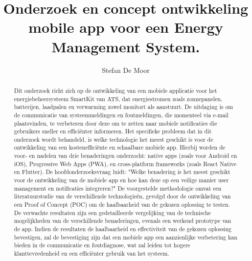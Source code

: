 \documentclass{hogent-article}
\title{Onderzoek en concept ontwikkeling mobile app voor een Energy Management System.}
\author{Stefan De Moor}
\begin{document}
\begin{abstract}
  Dit onderzoek richt zich op de ontwikkeling van een mobiele applicatie voor het energiebeheersysteem SmartKit van ATS, dat energiestromen zoals zonnepanelen, batterijen, laadpalen en verwarming zowel monitort als aanstuurt. De uitdaging is om de communicatie van systeemmeldingen en foutmeldingen, die momenteel via e-mail plaatsvinden, te verbeteren door deze om te zetten naar mobiele notificaties die gebruikers sneller en efficiënter informeren. Het specifieke probleem dat in dit onderzoek wordt behandeld, is welke technologie het meest geschikt is voor de ontwikkeling van een kostenefficiënte en schaalbare mobiele app. Hierbij worden de voor- en nadelen van drie benaderingen onderzocht: native apps (zoals voor Android en iOS), Progressive Web Apps (PWA), en cross-platform frameworks (zoals React Native en Flutter). De hoofdonderzoeksvraag luidt: "Welke benadering is het meest geschikt voor de ontwikkeling van de mobiele app en hoe kan deze op een veilige manier user management en notificaties integreren?" De voorgestelde methodologie omvat een literatuurstudie van de verschillende technologieën, gevolgd door de ontwikkeling van een Proof of Concept (POC) om de haalbaarheid van de gekozen oplossing te testen. De verwachte resultaten zijn een gedetailleerde vergelijking van de technische mogelijkheden van de verschillende benaderingen, evenals een werkend prototype van de app. Indien de resultaten de haalbaarheid en effectiviteit van de gekozen oplossing bevestigen, zal de bevestiging zijn dat een mobiele app een aanzienlijke verbetering kan bieden in de communicatie en foutdiagnose, wat zal leiden tot hogere klanttevredenheid en een efficiënter gebruik van het systeem.
\end{abstract}

\tableofcontents



\printbibliography[heading=bibintoc]
\end{document}
